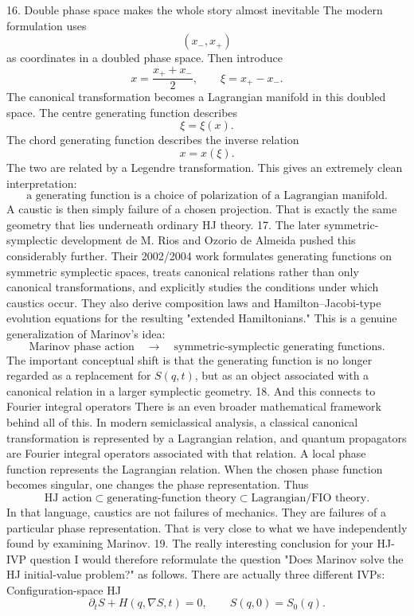 16. Double phase space makes the whole story almost inevitable
The modern formulation uses
$$ (x_-,x_+) $$
as coordinates in a doubled phase space.
Then introduce
$$ x=\frac{x_++x_-}{2}, \qquad \xi=x_+-x_-. $$
The canonical transformation becomes a Lagrangian manifold in this doubled space.
The centre generating function describes
$$ \xi=\xi(x). $$
The chord generating function describes the inverse relation
$$ x=x(\xi). $$
The two are related by a Legendre transformation.
This gives an extremely clean interpretation:
$$ \boxed{ \text{a generating function is a choice of polarization of a Lagrangian manifold}. } $$
A caustic is then simply failure of a chosen projection.
That is exactly the same geometry that lies underneath ordinary HJ theory.
17. The later symmetric-symplectic development
de M. Rios and Ozorio de Almeida pushed this considerably further.
Their 2002/2004 work formulates generating functions on symmetric symplectic spaces, treats canonical relations rather than only canonical transformations, and explicitly studies the conditions under which caustics occur. They also derive composition laws and Hamilton–Jacobi-type evolution equations for the resulting "extended Hamiltonians."
This is a genuine generalization of Marinov's idea:
$$ \text{Marinov phase action} \quad\longrightarrow\quad \text{symmetric-symplectic generating functions}. $$
The important conceptual shift is that the generating function is no longer regarded as a replacement for \(S(q,t)\), but as an object associated with a canonical relation in a larger symplectic geometry.
18. And this connects to Fourier integral operators
There is an even broader mathematical framework behind all of this.
In modern semiclassical analysis, a classical canonical transformation is represented by a Lagrangian relation, and quantum propagators are Fourier integral operators associated with that relation.
A local phase function represents the Lagrangian relation.
When the chosen phase function becomes singular, one changes the phase representation.
Thus
$$ \boxed{ \text{HJ action} \subset \text{generating-function theory} \subset \text{Lagrangian/FIO theory}. } $$
In that language, caustics are not failures of mechanics. They are failures of a particular phase representation.
That is very close to what we have independently found by examining Marinov.
19. The really interesting conclusion for your HJ-IVP question
I would therefore reformulate the question
"Does Marinov solve the HJ initial-value problem?"
as follows.
There are actually three different IVPs:
Configuration-space HJ
$$ \partial_tS+H(q,\nabla S,t)=0, \qquad S(q,0)=S_0(q). $$
